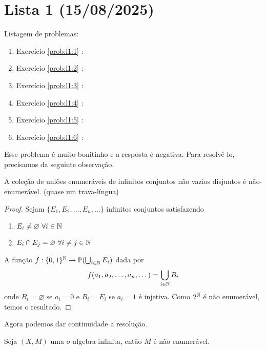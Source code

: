 \clearpage
\section{Lista 1 (15/08/2025)}

Listagem de problemas:
\begin{enumerate}
    \item Exercício \ref{prob:l1:1} : \checkmark
    \item Exercício \ref{prob:l1:2} : \checkmark
    \item Exercício \ref{prob:l1:3} : \checkmark
    \item Exercício \ref{prob:l1:4} : \checkmark
    \item Exercício \ref{prob:l1:5} : \checkmark
    \item Exercício \ref{prob:l1:6} : \checkmark
\end{enumerate}

\begin{problem}
    \label{prob:l1:1}
\end{problem}

Esse problema é muito bonitinho e a resposta é negativa. Para resolvê-lo, precisamos da seguinte observação.
\begin{observation}
    \label{obs:1:enum}
    A coleção de uniões enumeráveis de infinitos conjuntos não vazios disjuntos é não-enumerável. (quase um trava-língua)
\end{observation}
\begin{proof}
    Sejam $\{E_1, E_2, \dots, E_n, \dots\}$ infinitos conjuntos satisfazendo
    \begin{enumerate}
        \item $E_i \neq \varnothing \ \forall i \in \mathbb{N}$ 
        \item $E_i \cap E_j = \varnothing \ \forall i \neq j \in \mathbb{N}$ 
    \end{enumerate}
    A função $f: \{0,1\}^{\mathbb{N}} \rightarrow \mathbb{P}(\bigcup_{i \in \mathbb{N}} E_i)$ dada por
    $$f(a_1, a_2, \dots, a_n, \dots) = \bigcup_{i \in \mathbb{N}} B_i$$
    onde $B_i = \varnothing$ se $a_i = 0$ e $B_i = E_i$ se $a_i = 1$ é injetiva. Como $2^{\mathbb{N}}$ é não enumerável, temos o resultado.
\end{proof}
Agora podemos dar continuidade a resolução.
\begin{prop}
    Seja $(X,M)$ uma $\sigma$-algebra infinita, então $M$ é não enumerável.
\end{prop}

